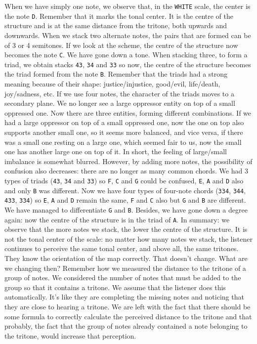 \documentclass[]{report}
\begin{document}
When we have simply one note, we observe that, in the \texttt{WHITE} scale, the center is the note \texttt{D}. Remember that it marks the tonal center. It is the centre of the structure and is at the same distance from the tritone, both upwards and downwards.
When we stack two alternate notes, the pairs that are formed can be of 3 or 4 semitones. If we look at the scheme, the centre of the structure now becomes the note \texttt{C}. We have gone down a tone.
When stacking three, to form a triad, we obtain stacks \texttt{43}, \texttt{34} and \texttt{33} so now, the centre of the structure becomes the triad formed from the note \texttt{B}. Remember that the triads had a strong meaning because of their shape: justice/injustice, good/evil, life/death, joy/sadness, etc.
If we use four notes, the character of the triads moves to a secondary plane. We no longer see a large oppressor entity on top of a small oppressed one. Now there are three entities, forming different combinations. If we had a large oppressor on top of a small oppressed one, now the one on top also supports another small one, so it seems more balanced, and vice versa, if there was a small one resting on a large one, which seemed fair to us, now the small one has another large one on top of it. In short, the feeling of large/small imbalance is somewhat blurred. However, by adding more notes, the possibility of confusion also decreases: there are no longer as many common chords.
We had 3 types of triads (\texttt{43}, \texttt{34} and \texttt{33}) so \texttt{F}, \texttt{C} and \texttt{G} could be confused, \texttt{E}, \texttt{A} and \texttt{D} also and only \texttt{B} was different. Now we have four types of four-note chords (\texttt{334}, \texttt{344}, \texttt{433}, \texttt{334}) so \texttt{E}, \texttt{A} and \texttt{D} remain the same, \texttt{F} and \texttt{C} also but \texttt{G} and \texttt{B} are different. We have managed to differentiate \texttt{G} and \texttt{B}. Besides, we have gone down a degree again: now the centre of the structure is in the triad of \texttt{A}.
In summary: we observe that the more notes we stack, the lower the centre of the structure. It is not the tonal center of the scale: no matter how many notes we stack, the listener continues to perceive the same tonal center, and above all, the same tritones. They know the orientation of the map correctly. That doesn't change. What are we changing then?
Remember how we measured the distance to the tritone of a group of notes. We considered the number of notes that must be added to the group so that it contains a tritone. We assume that the listener does this automatically. It's like they are completing the missing notes and noticing that they are close to hearing a tritone. We are left with the fact that there should be some formula to correctly calculate the perceived distance to the tritone and that probably, the fact that the group of notes already contained a note belonging to the tritone, would increase that perception.
\end{document}
